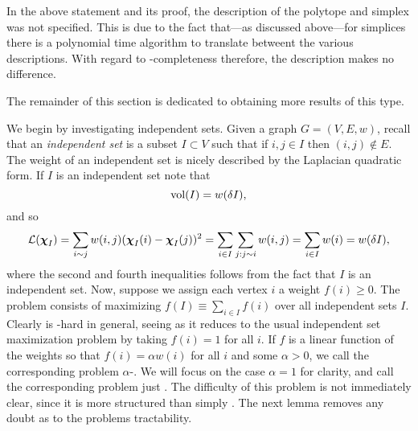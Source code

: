 \begin{remark} In  the above statement and its proof, the description of the polytope and simplex was not specified. This is due to the fact that---as discussed above---for simplices there is a polynomial time algorithm to translate betweent the various descriptions. With regard to \NP-completeness therefore, the description makes no difference. 
\end{remark}

The remainder of this section is dedicated to obtaining more results of this type. 

We begin by investigating independent sets. Given a graph $G=(V,E,w)$, recall that an \emph{independent set} is a subset $I\subset V$ such that if $i,j\in I$ then $(i,j)\notin E$. 
The weight of an independent set is nicely described by the Laplacian quadratic form. If $I$ is an independent set note that 
\[\textnormal{vol}(I) = w(\delta I),\] 
and so 
\begin{align*}
    \mathcal{L}(\boldsymbol{\chi}_I) = \sum_{i\sim j}w(i,j)(\boldsymbol{\chi}_I(i)-\boldsymbol{\chi}_I(j))^2 = \sum_{i\in I}\sum_{j:j\sim i} w(i,j) = \sum_{i\in I}w(i)=w(\delta I),
\end{align*}
where the second and fourth inequalities follows from the fact that $I$ is an independent set. Now, suppose we assign each vertex $i$ a weight $f(i)\geq 0$. The \mwis problem consists of maximizing $f(I)\equiv \sum_{i\in I}f(i)$ over all independent sets $I$. Clearly \mwis is \NP-hard in general, seeing as it reduces to the usual independent set maximization problem by taking $f(i)=1$ for all $i$. If $f$ is a linear function of the weights so that $f(i)=\alpha w(i)$ for all $i$ and some $\alpha> 0$, we call the corresponding problem $\alpha$-\vwis. We will focus on the case $\alpha=1$ for clarity, and call the  corresponding problem just \vwis. The difficulty of this problem is not immediately clear, since it is more structured than simply \mwis. The next lemma removes any doubt as to the problems tractability.   

